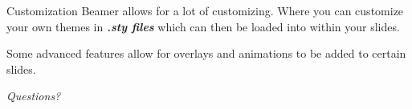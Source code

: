 \documentclass[pdf]{beamer}
\begin{document}
\begin{frame}{Customization}
    Beamer allows for a lot of customizing. Where you can customize your own themes in \textbf{\textit{.sty files}} 
    which can then be loaded into within your slides.
    \par Some advanced features allow for overlays and animations to be added to certain slides.
\end{frame}
\begin{frame}{}
    \centering \Large
    \emph{Questions?}
  \end{frame}
\end{document}
